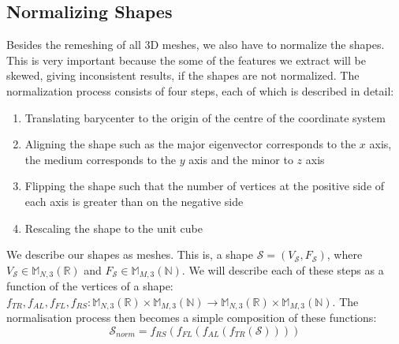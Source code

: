 \subsection{Normalizing Shapes}
Besides the remeshing of all 3D meshes, we also have to normalize the shapes.
This is very important because the some of the features we extract will be skewed, giving inconsistent results, if the
shapes are not normalized.
The normalization process consists of four steps, each of which is described in detail:
\begin{enumerate}
    \item Translating barycenter to the origin of the centre of the coordinate system
    \item Aligning the shape such as the major eigenvector corresponds to the $x$ axis, the medium corresponds to the $y$ axis and the minor to $z$ axis
    \item Flipping the shape such that the number of vertices at the positive side of each axis is greater than on the negative side
    \item Rescaling the shape to the unit cube
\end{enumerate}

We describe our shapes as meshes.
This is, a shape $\mathcal{S} = (V_{\mathcal{S}}, F_{\mathcal{S}})$, where $V_{\mathcal{S}} \in \mathbb{M}_{N,3}(\mathbb{R})$ and $F_{\mathcal{S}} \in \mathbb{M}_{M,3}(\mathbb{N})$.
We will describe each of these steps as a function of the vertices of a shape: $f_{TR},f_{AL},f_{FL},f_{RS}: \mathbb{M}_{N,3}(\mathbb{R}) \times \mathbb{M}_{M,3}(\mathbb{N}) \rightarrow \mathbb{M}_{N,3}(\mathbb{R}) \times \mathbb{M}_{M,3}(\mathbb{N})$.
The normalisation process then becomes a simple composition of these functions:
\begin{equation}
    \mathcal{S}_{norm} = f_{RS}(f_{FL}(f_{AL}(f_{TR} (\mathcal{S})))) 
\end{equation}

